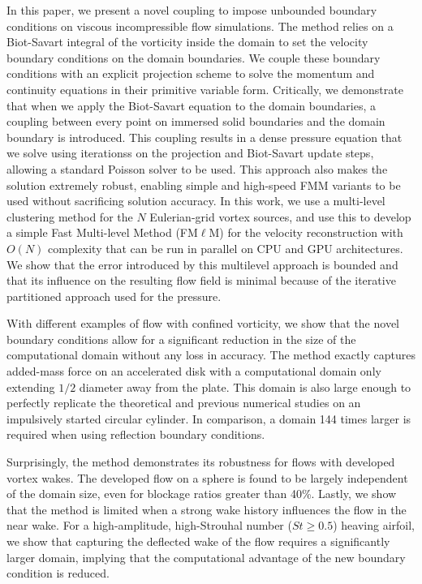 \documentclass[final,1p,times]{elsarticle}
\begin{document}
In this paper, we present a novel coupling to impose unbounded boundary conditions on viscous incompressible flow simulations. The method relies on a Biot-Savart integral of the vorticity inside the domain to set the velocity boundary conditions on the domain boundaries. We couple these boundary conditions with an explicit projection scheme to solve the momentum and continuity equations in their primitive variable form. Critically, we demonstrate that when we apply the Biot-Savart equation to the domain boundaries, a coupling between every point on immersed solid boundaries and the domain boundary is introduced. This coupling results in a dense pressure equation that we solve using iterationss on the projection and Biot-Savart update steps, allowing a standard Poisson solver to be used. This approach also makes the solution extremely robust, enabling simple and high-speed FMM variants to be used without sacrificing solution accuracy. In this work, we use a multi-level clustering method for the $N$ Eulerian-grid vortex sources, and use this to develop a simple Fast Multi-level Method (FM$\ell$M) for the velocity reconstruction with $O(N)$ complexity that can be run in parallel on CPU and GPU architectures. We show that the error introduced by this multilevel approach is bounded and that its influence on the resulting flow field is minimal because of the iterative partitioned approach used for the pressure.

With different examples of flow with confined vorticity, we show that the novel boundary conditions allow for a significant reduction in the size of the computational domain without any loss in accuracy. The method exactly captures added-mass force on an accelerated disk with a computational domain only extending $1/2$ diameter away from the plate. This domain is also large enough to perfectly replicate the theoretical and previous numerical studies on an impulsively started circular cylinder. In comparison, a domain 144 times larger is required when using reflection boundary conditions.

Surprisingly, the method demonstrates its robustness for flows with developed vortex wakes. The developed flow on a sphere is found to be largely independent of the domain size, even for blockage ratios greater than 40\%. 
Lastly, we show that the method is limited when a strong wake history influences the flow in the near wake. For a high-amplitude, high-Strouhal number ($St\ge0.5$) heaving airfoil, we show that capturing the deflected wake of the flow requires a significantly larger domain, implying that the computational advantage of the new boundary condition is reduced.
\end{document}
